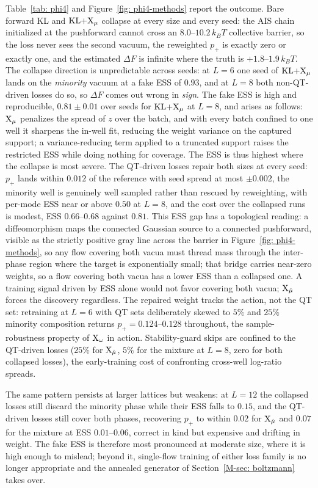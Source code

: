 \documentclass{article}
\begin{document}
Table~\ref{tab: phi4} and Figure~\ref{fig: phi4-methods} report the outcome. Bare forward KL and $\mathrm{KL}{+}\mathrm{X}_\mu$ collapse at every size and every seed: the AIS chain initialized at the pushforward cannot cross an $8.0$--$10.2\,k_B T$ collective barrier, so the loss never sees the second vacuum, the reweighted $p_+$ is exactly zero or exactly one, and the estimated $\Delta F$ is infinite where the truth is $+1.8$--$1.9\,k_B T$. The collapse direction is unpredictable across seeds: at $L = 6$ one seed of $\mathrm{KL}{+}\mathrm{X}_\mu$ lands on the \emph{minority} vacuum at a fake ESS of $0.93$, and at $L = 8$ both non-QT-driven losses do so, so $\Delta F$ comes out wrong in \emph{sign}. The fake ESS is high and reproducible, $0.81 \pm 0.01$ over seeds for $\mathrm{KL}{+}\mathrm{X}_\mu$ at $L = 8$, and arises as follows: $\mathrm{X}_\mu$ penalizes the spread of $z$ over the batch, and with every batch confined to one well it sharpens the in-well fit, reducing the weight variance on the captured support; a variance-reducing term applied to a truncated support raises the restricted ESS while doing nothing for coverage. The ESS is thus highest where the collapse is most severe. The QT-driven losses repair both sizes at every seed: $p_+$ lands within $0.012$ of the reference with seed spread at most $\pm 0.002$, the minority well is genuinely well sampled rather than rescued by reweighting, with per-mode ESS near or above $0.50$ at $L = 8$, and the cost over the collapsed runs is modest, ESS $0.66$--$0.68$ against $0.81$. This ESS gap has a topological reading: a diffeomorphism maps the connected Gaussian source to a connected pushforward, visible as the strictly positive gray line across the barrier in Figure~\ref{fig: phi4-methods}, so any flow covering both vacua must thread mass through the inter-phase region where the target is exponentially small; that bridge carries near-zero weights, so a flow covering both vacua has a lower ESS than a collapsed one. A training signal driven by ESS alone would not favor covering both vacua; $\mathrm{X}_{\hat\mu}$ forces the discovery regardless. The repaired weight tracks the action, not the QT set: retraining at $L = 6$ with QT sets deliberately skewed to $5\%$ and $25\%$ minority composition returns $p_+ = 0.124$--$0.128$ throughout, the sample-robustness property of $\mathrm{X}_\omega$ in action. Stability-guard skips are confined to the QT-driven losses ($25\%$ for $\mathrm{X}_{\hat\mu}$, $5\%$ for the mixture at $L = 8$, zero for both collapsed losses), the early-training cost of confronting cross-well log-ratio spreads.

The same pattern persists at larger lattices but weakens: at $L = 12$ the collapsed losses still discard the minority phase while their ESS falls to $0.15$, and the QT-driven losses still cover both phases, recovering $p_+$ to within $0.02$ for $\mathrm{X}_{\hat\mu}$ and $0.07$ for the mixture at ESS $0.01$--$0.06$, correct in kind but expensive and drifting in weight. The fake ESS is therefore most pronounced at moderate size, where it is high enough to mislead; beyond it, single-flow training of either loss family is no longer appropriate and the annealed generator of Section~\ref{M-sec: boltzmann} takes over.
\end{document}
